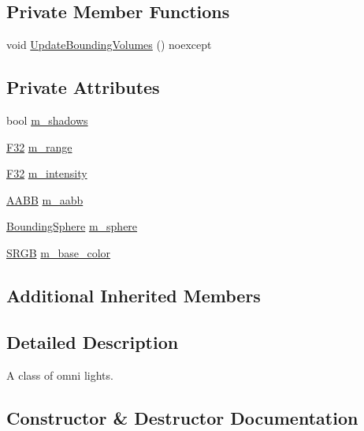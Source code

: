 \subsection*{Private Member Functions}
\begin{DoxyCompactItemize}
\item 
void \hyperlink{classmage_1_1rendering_1_1_omni_light_a44c6dee7d24c879aab0284ac21910337}{Update\+Bounding\+Volumes} () noexcept
\end{DoxyCompactItemize}
\subsection*{Private Attributes}
\begin{DoxyCompactItemize}
\item 
bool \hyperlink{classmage_1_1rendering_1_1_omni_light_af0cb508d0333f86cf64c28f5628177d4}{m\+\_\+shadows}
\item 
\hyperlink{namespacemage_aa97e833b45f06d60a0a9c4fc22ae02c0}{F32} \hyperlink{classmage_1_1rendering_1_1_omni_light_a4737ecec7dd824c75073d849b604fe1d}{m\+\_\+range}
\item 
\hyperlink{namespacemage_aa97e833b45f06d60a0a9c4fc22ae02c0}{F32} \hyperlink{classmage_1_1rendering_1_1_omni_light_af7ba6e05e5809d16ec070a2b2de47a62}{m\+\_\+intensity}
\item 
\hyperlink{classmage_1_1_a_a_b_b}{A\+A\+BB} \hyperlink{classmage_1_1rendering_1_1_omni_light_ac2b5bb2e28364445c7bce70c8fa1374e}{m\+\_\+aabb}
\item 
\hyperlink{classmage_1_1_bounding_sphere}{Bounding\+Sphere} \hyperlink{classmage_1_1rendering_1_1_omni_light_af11a99e2b1500093b9bd0e3ff16b04e6}{m\+\_\+sphere}
\item 
\hyperlink{structmage_1_1_s_r_g_b}{S\+R\+GB} \hyperlink{classmage_1_1rendering_1_1_omni_light_a28eb04892aa516cbca86591ebb839b78}{m\+\_\+base\+\_\+color}
\end{DoxyCompactItemize}
\subsection*{Additional Inherited Members}


\subsection{Detailed Description}
A class of omni lights. 

\subsection{Constructor \& Destructor Documentation}
\hypertarget{classmage_1_1rendering_1_1_omni_light_a641472ade99dc84b6e82e3d01d8b574a}{}\label{classmage_1_1rendering_1_1_omni_light_a641472ade99dc84b6e82e3d01d8b574a} 
